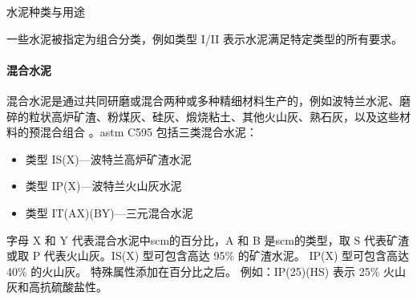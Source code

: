 \begin{table}
  \caption{水泥种类与用途}\label{tab:cement-types}
  
\end{table}

一些水泥被指定为组合分类，例如类型 I/II 表示水泥满足特定类型的所有要求。

\paragraph{混合水泥}
混合水泥是通过共同研磨或混合两种或多种精细材料生产的，例如波特兰水泥、磨碎的粒状高炉矿渣、粉煤灰、硅灰、煅烧粘土、其他火山灰、熟石灰，以及这些材料的预混合组合  \cite{kosmatka2011d}。\acrshort*{astm} C595 包括三类混合水泥：

\begin{itemize}
  \item 类型 IS(X)—波特兰高炉矿渣水泥
  \item 类型 IP(X)—波特兰火山灰水泥
  \item 类型 IT(AX)(BY)—三元混合水泥
\end{itemize}

字母 X 和 Y 代表混合水泥中\acrlong*{scm}的百分比，A 和 B 是\acrlong*{scm}的类型，取 S 代表矿渣或取 P 代表火山灰。IS(X) 型可包含高达 95\% 的矿渣水泥。 IP(X) 型可包含高达 40\% 的火山灰。 特殊属性添加在百分比之后。 例如：IP(25)(HS) 表示 25\% 火山灰和高抗硫酸盐性。

